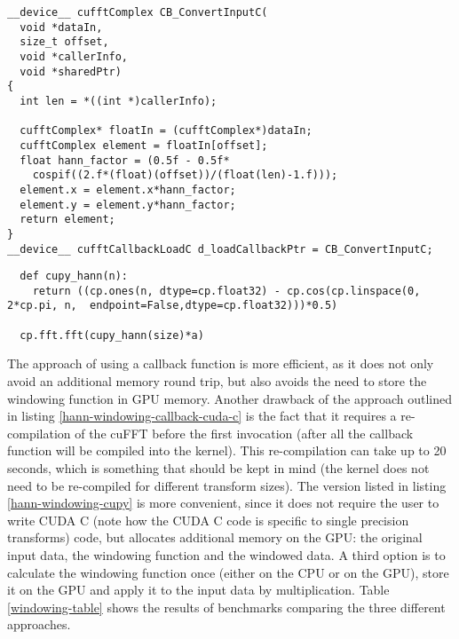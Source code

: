 \documentclass[english,11pt,a4paper,table]{article} %
\begin{document}
\begin{minipage}[t]{.49\textwidth}
	\begin{verbatim}
__device__ cufftComplex CB_ConvertInputC(
  void *dataIn,
  size_t offset,
  void *callerInfo,
  void *sharedPtr)
{
  int len = *((int *)callerInfo);

  cufftComplex* floatIn = (cufftComplex*)dataIn;
  cufftComplex element = floatIn[offset];
  float hann_factor = (0.5f - 0.5f*
    cospif((2.f*(float)(offset))/(float(len)-1.f)));
  element.x = element.x*hann_factor;
  element.y = element.y*hann_factor;
  return element;
}
__device__ cufftCallbackLoadC d_loadCallbackPtr = CB_ConvertInputC;
\end{verbatim}
	\label{hann-windowing-callback-cuda-c}
\end{minipage}\hfill%
\begin{minipage}[t]{.49\textwidth}
	\begin{verbatim}
  def cupy_hann(n):
    return ((cp.ones(n, dtype=cp.float32) - cp.cos(cp.linspace(0, 2*cp.pi, n,  endpoint=False,dtype=cp.float32)))*0.5)

  cp.fft.fft(cupy_hann(size)*a)
\end{verbatim}
	\label{hann-windowing-cupy}
\end{minipage}%

The approach of using a callback function is more efficient, as it does not only avoid an additional memory round trip, but also avoids the need to store the windowing function in GPU memory.
Another drawback of the approach outlined in listing \ref{hann-windowing-callback-cuda-c} is the fact that it requires a re-compilation of the cuFFT before the first invocation (after all the callback function will be compiled into the kernel). This re-compilation can take up to 20 seconds, which is something that should be kept in mind (the kernel does not need to be re-compiled for different transform sizes).
The version listed in listing \ref{hann-windowing-cupy} is more convenient, since it does not require the user to write CUDA C (note how the CUDA C code is specific to single precision transforms) code, but allocates additional memory on the GPU: the original input data, the windowing function and the windowed data.
A third option is to calculate the windowing function once (either on the CPU or on the GPU), store it on the GPU and apply it to the input data by multiplication.
Table \ref{windowing-table} shows the results of benchmarks comparing the three different approaches.
\end{document}
